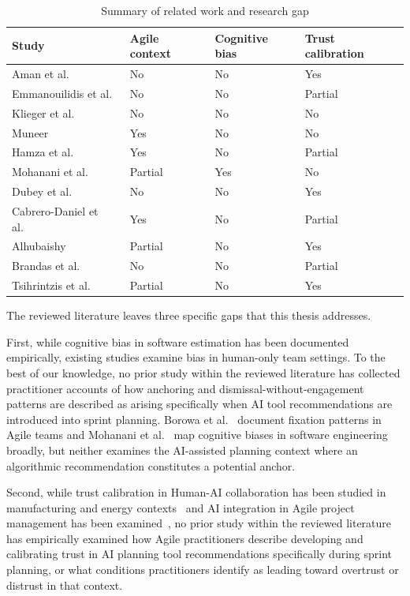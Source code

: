 \documentclass[a4paper,twoside]{bth}
\begin{document}
\begin{table}[htb]
\caption{Summary of related work and research gap}
\label{tab:relatedwork}
\centering
\begin{tabular}{L{4.8cm} L{2.0cm} L{2.0cm} L{2.2cm}}
\toprule
Study & Agile context & Cognitive bias & Trust calibration \\
\midrule
Aman et al.~\cite{aman2025systematic} & No & No & Yes \\
Emmanouilidis et al.~\cite{emmanouilidis2025co} & No & No & Partial \\
Klieger et al.~\cite{klieger2024chatcollab} & No & No & No \\
Muneer~\cite{muneer2025leveraging} & Yes & No & No \\
Hamza et al.~\cite{hamza2025agile} & Yes & No & Partial \\
Mohanani et al.~\cite{mohanani2018cognitive} & Partial & Yes & No \\
Dubey et al.~\cite{dubey2020haco} & No & No & Yes \\
Cabrero-Daniel et al.~\cite{cabrero2024exploring} & Yes & No & Partial \\
Alhubaishy~\cite{alhubaishy2026exploring} & Partial & No & Yes \\
Brandas et al.~\cite{brandas2026social} & No & No & Partial \\
Tsihrintzis et al.~\cite{tsihrintzis2025virtsi} & Partial & No & Yes \\

\bottomrule
\end{tabular}
\end{table}

The reviewed literature leaves three specific gaps that this thesis addresses.

First, while cognitive bias in software estimation has been documented empirically, existing studies examine bias in human-only team settings. To the best of our knowledge, no prior study within the reviewed literature has collected practitioner accounts of how anchoring and dismissal-without-engagement patterns are described as arising specifically when AI tool recommendations are introduced into sprint planning. Borowa et al.~\cite{borowa2023fixations} document fixation patterns in Agile teams and Mohanani et al.~\cite{mohanani2018cognitive} map cognitive biases in software engineering broadly, but neither examines the AI-assisted planning context where an algorithmic recommendation constitutes a potential anchor.

Second, while trust calibration in Human-AI collaboration has been studied in manufacturing and energy contexts~\cite{emmanouilidis2025co, tsihrintzis2025virtsi} and AI integration in Agile project management has been examined~\cite{hamza2025agile, cabrero2024exploring}, no prior study within the reviewed literature has empirically examined how Agile practitioners describe developing and calibrating trust in AI planning tool recommendations specifically during sprint planning, or what conditions practitioners identify as leading toward overtrust or distrust in that context.
\end{document}
